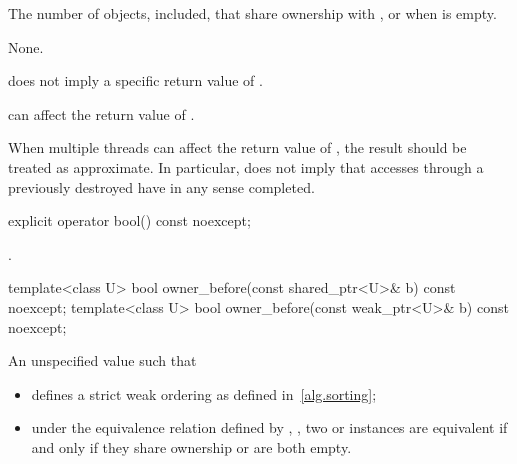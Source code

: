 \begin{itemdescr}
\pnum\returns  The number of  objects,  included,
that share ownership with , or  when  is
empty.

\pnum\sync None.

\pnum \begin{note} 
does not imply a specific return value of . \end{note}

\pnum \begin{note} 
can affect the return value of . \end{note}

\pnum \begin{note} When multiple threads
can affect the return value of ,
the result should be treated as approximate.
In particular,  does not imply that accesses through
a previously destroyed  have in any sense completed. \end{note}
\end{itemdescr}

%
\begin{itemdecl}
explicit operator bool() const noexcept;
\end{itemdecl}

\begin{itemdescr}
\pnum\returns {}.
\end{itemdescr}

%
\begin{itemdecl}
template<class U> bool owner_before(const shared_ptr<U>& b) const noexcept;
template<class U> bool owner_before(const weak_ptr<U>& b) const noexcept;
\end{itemdecl}

\begin{itemdescr}
\pnum
\returns An unspecified value such that

\begin{itemize}
\item {} defines a strict weak ordering as defined in~\ref{alg.sorting};

\item under the equivalence relation defined by ,
, two  or
 instances are equivalent if and only if they share ownership or
are both empty.
\end{itemize}

\end{itemdescr}

